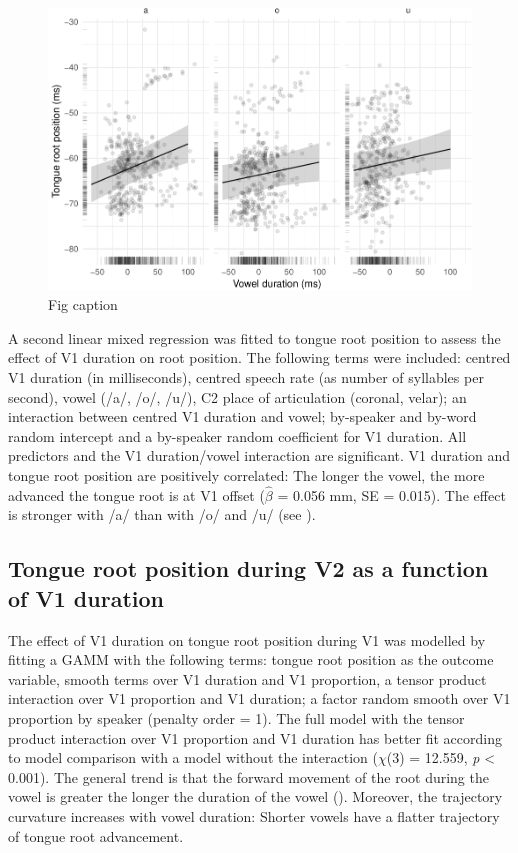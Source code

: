 \documentclass[12pt,]{article}
\begin{document}
\begin{figure}
\includegraphics[width=\linewidth]{2018-tra_files/figure-latex/tra-lm-2-plot-1} \caption{Fig caption}\label{f:tra-lm-2-plot}
\end{figure}

A second linear mixed regression was fitted to tongue root position to
assess the effect of V1 duration on root position. The following terms
were included: centred V1 duration (in milliseconds), centred speech
rate (as number of syllables per second), vowel (/a/, /o/, /u/), C2
place of articulation (coronal, velar); an interaction between centred
V1 duration and vowel; by-speaker and by-word random intercept and a
by-speaker random coefficient for V1 duration. All predictors and the V1
duration/vowel interaction are significant. V1 duration and tongue root
position are positively correlated: The longer the vowel, the more
advanced the tongue root is at V1 offset (\(\hat{\beta}\) = 0.056 mm, SE
= 0.015). The effect is stronger with /a/ than with /o/ and /u/ (see
).

\hypertarget{tongue-root-position-during-v2-as-a-function-of-v1-duration}{%
\subsection{Tongue root position during V2 as a function of V1
duration}\label{tongue-root-position-during-v2-as-a-function-of-v1-duration}}

The effect of V1 duration on tongue root position during V1 was modelled
by fitting a GAMM with the following terms: tongue root position as the
outcome variable, smooth terms over V1 duration and V1 proportion, a
tensor product interaction over V1 proportion and V1 duration; a factor
random smooth over V1 proportion by speaker (penalty order = 1). The
full model with the tensor product interaction over V1 proportion and V1
duration has better fit according to model comparison with a model
without the interaction (\(\chi\)(3) = 12.559, \emph{p} \textless{}
0.001). The general trend is that the forward movement of the root
during the vowel is greater the longer the duration of the vowel
(). Moreover, the trajectory curvature increases
with vowel duration: Shorter vowels have a flatter trajectory of tongue
root advancement.
\end{document}
